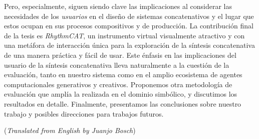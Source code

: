 Pero, especialmente, siguen siendo clave las implicaciones al considerar las necesidades de los \textit {usuarios} en el diseño de sistemas concatenativos y el lugar que estos ocupan en sus procesos compositivos y de producción. La contribución final de la tesis es \textit {RhythmCAT}, un instrumento virtual visualmente atractivo y con una metáfora de interacción única para la exploración de la síntesis concatenativa de una manera práctica y fácil de usar. Este énfasis en las implicaciones del usuario de la síntesis concatenativa lleva naturalmente a la cuestión de la evaluación, tanto en nuestro sistema como en el amplio ecosistema de agentes computacionales generativos y creativos. Proponemos otra metodología de evaluación que amplía la realizada en el dominio simbólico, y discutimos los resultados en detalle. Finalmente, presentamos las conclusiones sobre nuestro trabajo y posibles direcciones para trabajos futuros.

\vfill
{\small \noindent (\emph{Translated from English by Juanjo Bosch})}
